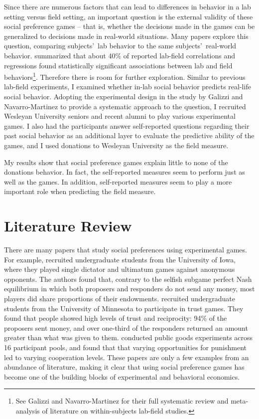 \documentclass[12pt]{article}
\begin{document}
Since there are numerous factors that can lead to differences in behavior in a lab setting versus field setting, an important question is the external validity of these social preference games -- that is, whether the decisions made in the games can be generalized to decisions made in real-world situations. Many papers explore this question, comparing subjects\rq \ lab behavior  to the same subjects\rq \ real-world behavior. \cite{galizzi_navarro-martinez_2017} summarized that about 40\% of reported lab-field correlations and regressions found statistically significant associations between lab and field behaviors\footnote{See Galizzi and Navarro-Martinez for their full systematic review and meta-analysis of literature on within-subjects lab-field studies.}. Therefore there is room for further exploration. Similar to previous lab-field experiments, I examined whether in-lab social behavior predicts real-life social behavior. Adopting the experimental design in the study by Galizzi and Navarro-Martinez to provide a systematic approach to the question, I recruited Wesleyan University seniors and recent alumni to play various experimental games. I also had the participants answer self-reported questions regarding their past social behavior as an additional layer to evaluate the predictive ability of the games, and I used donations to Wesleyan University as the field measure.

My results show that social preference games explain little to none of the donations behavior. In fact, the self-reported measures seem to perform just as well as the games. In addition, self-reported measures seem to play a more important role when predicting the field measure.

\newpage

\section{Literature Review}

There are many papers that study social preferences using experimental games. For example, \cite{forsythe_1994} recruited undergraduate students from the University of Iowa, where they played single dictator and ultimatum games against anonymous opponents. The authors found that, contrary to the selfish subgame perfect Nash equilibrium in which both proposers and responders do not send any money, most players did share proportions of their endowments. \cite{berg_1995} recruited undergraduate students from the University of Minnesota to participate in trust games. They found that people showed high levels of trust and reciprocity: 94\% of the proposers sent money, and over one-third of the responders returned an amount greater than what was given to them. \cite{hermann_thoni_gachter_2008} conducted public goods experiments across 16 participant pools, and found that that varying opportunities for punishment led to varying cooperation levels. These papers are only a few examples from an abundance of literature, making it clear that using social preference games has become one of the building blocks of experimental and behavioral economics. 
 
\end{document}
